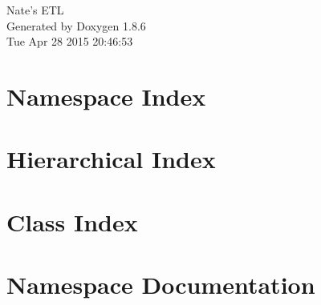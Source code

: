 \documentclass[twoside]{book}
\newcommand{\clearemptydoublepage}{%
  \newpage{\pagestyle{empty}\cleardoublepage}%
}
\begin{document}
\hypersetup{pageanchor=false}
\begin{titlepage}
\vspace*{7cm}
\begin{center}%
{\Large Nate's E\-T\-L }\\
\vspace*{1cm}
{\large Generated by Doxygen 1.8.6}\\
\vspace*{0.5cm}
{\small Tue Apr 28 2015 20:46:53}\\
\end{center}
\end{titlepage}
\clearemptydoublepage
\tableofcontents
\clearemptydoublepage
{}
\hypersetup{pageanchor=true}

\chapter{Namespace Index}

\chapter{Hierarchical Index}

\chapter{Class Index}

\chapter{Namespace Documentation}









\end{document}
